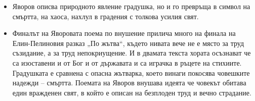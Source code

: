 \documentclass[12pt,a4paper]{article}
\begin{document}
\begin{itemize}[leftmargin=*, noitemsep, topsep=2pt, parsep=0pt]
    \vspace{0.1cm}
    \item Яворов описва природното явление градушка, но и го превръща в символ на смъртта, на хаоса, нахлул в градения с толкова усилия свят.
    \vspace{0.1cm}
    \item Финалът на Яворовата поема по внушение прилича много на финала на Елин-Пелиновия разказ „По жътва“, където нивата вече не е място за труд съзидание, а за труд непокриущение. И в двамата текста хората осъзнават че са изоставени и от Бог и от държавата и са играчка в ръцете на стихиите. Градушката е сравнена с опасна жътварка, което винаги покосява човешките надежди – смъртта. Поемата на Яворов внушава идеята че човекът обитава един вражденен свят, в който е описан на безплоден труд и вечно страдание.
\end{itemize}

\newpage
\end{document}
